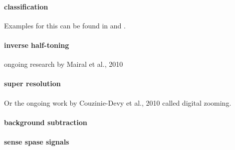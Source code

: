 \paragraph{classification} Examples for this can be found in \cite{Mairal2008b} and \cite{Bar2009}.
\paragraph{inverse half-toning} ongoing research by Mairal et al., 2010 \cite{Mairal2010b}
\paragraph{super resolution} \cite{Yang2010} \cite{Wright2008}  
Or the ongoing work by Couzinie-Devy et al., 2010 called digital zooming.
\paragraph{background subtraction} \cite{}

\paragraph{sense spase signals}\cite{Duarte2009}






